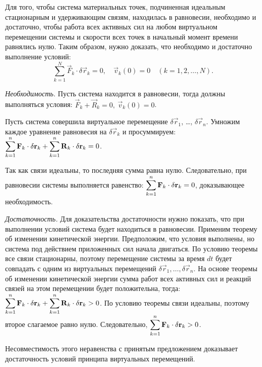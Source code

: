 
Для того, чтобы система материальных точек, подчиненная идеальным стационарным и
удерживающим связям, находилась в равновесии, необходимо и достаточно, чтобы
работа всех активных сил на любом виртуальном перемещении системы и скорости
всех точек в начальный момент времени равнялись нулю. Таким образом, нужно
доказать, что необходимо и достаточно выполнение условий:
\[
    \sum_{k=1}^N \vec{F}_k\cdot\delta\vec{r}_k = 0,\quad
    \vec{v}_k(0) = 0 \quad (k = 1, 2, \ldots, N).
\]

\emph{Необходимость.} Пусть система находится в равновесии, тогда должны
выполняться условия: \( \vec{F}_k + \vec{R}_k = 0,\ \vec{v}_k(0) = 0 \).

Пусть система совершила виртуальное перемещение \( \delta\vec{r}_1 \), \ldots,
\( \delta\vec{r}_n \). Умножим каждое уравнение равновесия на
\( \delta\vec{r}_k \) и просуммируем: \( \displaystyle \sum_{k=1}^n \boldsymbol{\mathrm{F}}_k\cdot\delta
\boldsymbol{\mathrm{r}}_k + \sum_{k=1}^n \boldsymbol{\mathrm{R}}_k\cdot\delta\boldsymbol{\mathrm{r}}_k = 0 \).
 
Так как связи идеальны, то последняя сумма равна нулю. Следовательно, при
равновесии системы выполняется равенство: \( \displaystyle \sum_{k=1}^n \boldsymbol{\mathrm{F}}_k\cdot
\delta\boldsymbol{\mathrm{r}}_k = 0 \), доказывающее необходимость.

\emph{Достаточность.} Для доказательства достаточности нужно показать, что при
выполнении условий система будет находиться в равновесии. Применим теорему об
изменении кинетической энергии. Предположим, что условия выполнены, но система
под действием приложенных сил начала двигаться. По условию теоремы все связи
стационарны, поэтому перемещение системы за время \( dt \) будет совпадать с
одним из виртуальных перемещений \( \delta\vec{r}_1, \ldots, \delta\vec{r}_n \).
На основе теоремы об изменении кинетической энергии сумма работ всех активных
сил и реакций связей на этом перемещении будет положительна, тогда:
\( \displaystyle \sum_{k=1}^n \boldsymbol{\mathrm{F}}_k\cdot\delta\boldsymbol{\mathrm{r}}_k + \sum_{k=1}^n \boldsymbol{\mathrm{R}}_k\cdot
\delta\boldsymbol{\mathrm{r}}_k > 0 \). По условию теоремы связи идеальны, поэтому второе
слагаемое равно нулю. Следовательно,
\( \displaystyle \sum_{k=1}^n \boldsymbol{\mathrm{F}}_k\cdot\delta\boldsymbol{\mathrm{r}}_k > 0 \).

Несовместимость этого неравенства с принятым предложением доказывает
достаточность условий принципа виртуальных перемещений.

